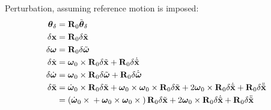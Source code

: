 \documentclass[10pt,dvips,fleqn,subeqn]{report}
\newcommand{\T}[1]{\bm{\mathbf{#1}}}
\newcommand{\TT}[1]{\bm{\mathbf{#1}}}
\begin{document}
Perturbation, assuming reference motion is imposed:
\begin{subequations}
\begin{align}
	\T{\theta}_{\delta}
	&= \TT{R}_0 \tilde{\T{\theta}}_{\delta} \\
	\delta\T{x} &= \TT{R}_0 \delta\tilde{\T{x}} \\
	\delta\T{\omega} &= \TT{R}_0 \delta\tilde{\T{\omega}} \\
	\delta\dot{\T{x}} &= 
		\T{\omega}_0 \times \TT{R}_0 \delta\tilde{\T{x}}
		+ \TT{R}_0 \delta\dot{\tilde{\T{x}}} \\
	\delta\dot{\T{\omega}} &= 
		\T{\omega}_0 \times \TT{R}_0 \delta\tilde{\T{\omega}}
		+ \TT{R}_0 \delta\dot{\tilde{\T{\omega}}} \\
	\delta\ddot{\T{x}}
		&= \dot{\T{\omega}}_0 \times \TT{R}_0 \delta\tilde{\T{x}}
		+ \T{\omega}_0 \times \T{\omega}_0 \times \TT{R}_0 \delta\tilde{\T{x}}
		+ 2 \T{\omega}_0 \times \TT{R}_0 \delta\dot{\tilde{\T{x}}}
		+ \TT{R}_0 \delta\ddot{\tilde{\T{x}}}
		\nonumber \\
		&= \plbr{
			\dot{\T{\omega}}_0 \times{}
			+ \T{\omega}_0 \times \T{\omega}_0 \times{}
		} \TT{R}_0 \delta\tilde{\T{x}}
		+ 2 \T{\omega}_0 \times \TT{R}_0 \delta\dot{\tilde{\T{x}}}
		+ \TT{R}_0 \delta\ddot{\tilde{\T{x}}}
\end{align}
\end{subequations}
\end{document}
